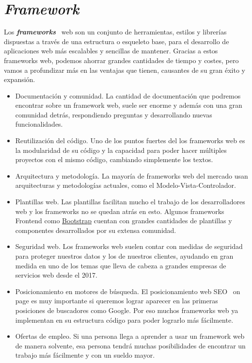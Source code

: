 \section{\textit{Framework}}
Los \textbf{\textit{frameworks}}~\cite{framework} web son un conjunto de herramientas, estilos y librerías dispuestas a través de una estructura o esqueleto base, para el desarrollo de aplicaciones web más escalables y sencillas de mantener.
Gracias a estos frameworks web, podemos ahorrar grandes cantidades de tiempo y costes, pero vamos a profundizar más en las ventajas que tienen, causantes de su gran éxito y expansión.
\begin{itemize}	
	\item Documentación y comunidad. La cantidad de documentación que podremos encontrar sobre un framework web, suele ser enorme y además con una gran comunidad detrás, respondiendo preguntas y desarrollando nuevas funcionalidades.

	\item Reutilización del código. Uno de los puntos fuertes del los frameworks web es la modularidad de su código y la capacidad para poder hacer múltiples proyectos con el mismo código, cambiando simplemente los textos.

	\item Arquitectura y metodología. La mayoría de frameworks web del mercado usan arquitecturas y metodologías actuales, como el Modelo-Vista-Controlador.

	\item Plantillas web. Las plantillas facilitan mucho el trabajo de los desarrolladores web y los frameworks no se quedan atrás en esto. Algunos frameworks Frontend como \href{https://getbootstrap.com/}{Bootstrap} cuentan con grandes cantidades de plantillas y componentes desarrollados por su extensa comunidad.
	
	\item Seguridad web. Los frameworks web suelen contar con medidas de seguridad para proteger nuestros datos y los de nuestros clientes, ayudando en gran medida en uno de los temas que lleva de cabeza a grandes empresas de servicios web desde el 2017.
	
	\item Posicionamiento en motores de búsqueda. El posicionamiento web SEO~\cite{framework} on page es muy importante si queremos lograr aparecer en las primeras posiciones de buscadores como Google. Por eso muchos frameworks web ya implementan en su estructura código para poder lograrlo más fácilmente.
	
	\item Ofertas de empleo. Si una persona llega a aprender a usar un framework web de manera solvente, esa persona tendrá muchas posibilidades de encontrar un trabajo más fácilmente y con un sueldo mayor.
\end{itemize}

